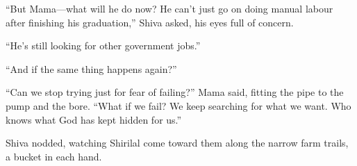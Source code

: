 ``But Mama—what will he do now? He can't just go on doing manual labour after finishing his graduation,'' Shiva asked, his eyes full of concern.

``He's still looking for other government jobs.''

``And if the same thing happens again?''

``Can we stop trying just for fear of failing?'' Mama said, fitting the pipe to the pump and the bore. ``What if we fail? We keep searching for what we want. Who knows what God has kept hidden for us.''

Shiva nodded, watching Shirilal come toward them along the narrow farm trails, a bucket in each hand.